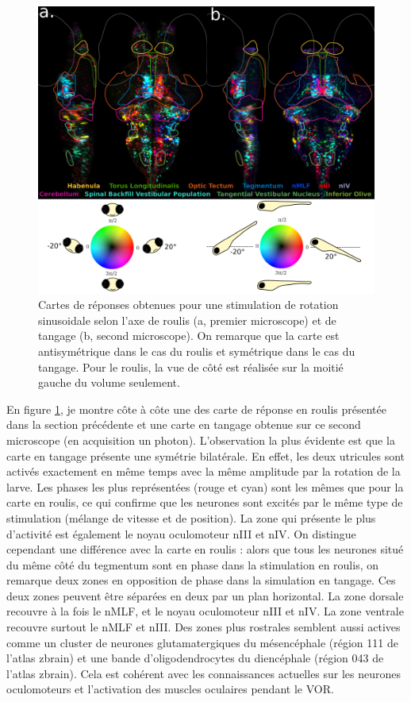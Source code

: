 \begin{figure}
\centering
\includegraphics[width=\textwidth]{./files/tilt_roll.svg.png}
\caption{Cartes de réponses obtenues pour une stimulation de rotation sinusoidale selon l'axe de roulis (a, premier microscope) et de tangage (b, second microscope). On remarque que la carte est antisymétrique dans le cas du roulis et symétrique dans le cas du tangage.
Pour le roulis, la vue de côté est réalisée sur la moitié gauche du volume seulement.
\label{FIGtiltroll}}
\end{figure}

En figure \ref{FIGtiltroll}, je montre côte à côte une des carte de réponse en roulis présentée dans la section précédente et une carte en tangage obtenue sur ce second microscope (en acquisition un photon). L'observation la plus évidente est que la carte en tangage présente une symétrie bilatérale. En effet, les deux utricules sont activés exactement en même temps avec la même amplitude par la rotation de la larve. Les phases les plus représentées (rouge et cyan) sont les mêmes que pour la carte en roulis, ce qui confirme que les neurones sont excités par le même type de stimulation (mélange de vitesse et de position). La zone qui présente le plus d'activité est également le noyau oculomoteur nIII et nIV. On distingue cependant une différence avec la carte en roulis : alors que tous les neurones situé du même côté du tegmentum sont en phase dans la stimulation en roulis, on remarque deux zones en opposition de phase dans la simulation en tangage. Ces deux zones peuvent être séparées en deux par un plan horizontal. La zone dorsale recouvre à la fois le nMLF, et le noyau oculomoteur nIII et nIV. La zone ventrale recouvre surtout le nMLF et nIII. Des zones plus rostrales semblent aussi actives comme un cluster de neurones glutamatergiques du mésencéphale (région 111 de l'atlas zbrain) et une bande d'oligodendrocytes du diencéphale (région 043 de l'atlas zbrain). Cela est cohérent avec les connaissances actuelles sur les neurones oculomoteurs \cite{schoppik_gaze-stabilizing_2017} et l'activation des muscles oculaires pendant le VOR.

